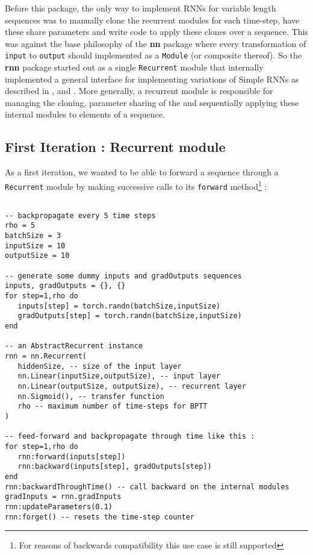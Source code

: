 \documentclass{article} %
\providecommand{\inlinecode}[1]{\texttt{#1}}
\begin{document}
Before this package, the only way to implement RNNs for variable length sequences was to manually 
clone the recurrent modules for each time-step, have these share parameters and
write code to apply these clones over a sequence. This was against the base
philosophy of the \textbf{nn} package where every transformation of \inlinecode{input} to \inlinecode{output} should 
implemented as a \inlinecode{Module} (or composite thereof). 
So the \textbf{rnn} package started out as a single \inlinecode{Recurrent} module that 
internally implemented a general interface for implementing variations of Simple RNNs
as described in \cite[section 2.5-2.8]{sutskever2013training}, 
\cite[section~3.2-3.3]{mikolov2012statistical} and \cite{boden2001guide}. 
More generally, a recurrent module is responsible for managing the cloning, 
parameter sharing of the and sequentially applying these internal modules
to elements of a sequence. 

\subsection{First Iteration : Recurrent module}

As a first iteration, we wanted to be able to forward a sequence through a \inlinecode{Recurrent}
module by making successive calls to its \inlinecode{forward} method\footnote{For reasons of backwards 
compatibility this use case is still supported} :

\begin{verbatim}

-- backpropagate every 5 time steps
rho = 5
batchSize = 3
inputSize = 10
outputSize = 10

-- generate some dummy inputs and gradOutputs sequences
inputs, gradOutputs = {}, {}
for step=1,rho do
   inputs[step] = torch.randn(batchSize,inputSize)
   gradOutputs[step] = torch.randn(batchSize,inputSize)
end

-- an AbstractRecurrent instance
rnn = nn.Recurrent(
   hiddenSize, -- size of the input layer
   nn.Linear(inputSize,outputSize), -- input layer
   nn.Linear(outputSize, outputSize), -- recurrent layer
   nn.Sigmoid(), -- transfer function
   rho -- maximum number of time-steps for BPTT
)

-- feed-forward and backpropagate through time like this :
for step=1,rho do
   rnn:forward(inputs[step])
   rnn:backward(inputs[step], gradOutputs[step])
end
rnn:backwardThroughTime() -- call backward on the internal modules
gradInputs = rnn.gradInputs
rnn:updateParameters(0.1)
rnn:forget() -- resets the time-step counter
\end{verbatim}
\end{document}
